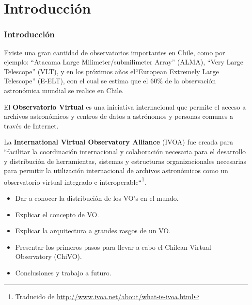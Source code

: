 \section{Introducción}
\begin{frame}
\frametitle{Introducción}
Existe una gran cantidad de observatorios importantes en Chile, como por
ejemplo: ``Atacama Large Milimeter/submilimeter Array'' (ALMA), ``Very Large
Telescope'' (VLT), y en los próximos años el``European Extremely Large
Telescope'' (E-ELT), con el cual se estima que el 60\% de la observación
astronómica mundial se realice en Chile.  
\newline

El \textbf{Observatorio Virtual} es una iniciativa internacional que permite el
acceso a archivos astronómicos y centros de datos a astrónomos y personas
comunes a través de Internet. 

\end{frame}

\begin{frame}
La \textbf{International Virtual Observatory Alliance} (IVOA) fue creada para
``facilitar la coordinación internacional y colaboración necesaria para el
desarrollo y distribución de herramientas, sistemas y estructuras
organizacionales necesarias para permitir la utilización internacional de
archivos astronómicos como un observatorio virtual integrado e
interoperable``\footnote{Traducido de
\url{http://www.ivoa.net/about/what-is-ivoa.html}}.

\begin{itemize}
    \item Dar a conocer la distribución de los VO's en el mundo.
    \item Explicar el concepto de VO.
    \item Explicar la arquitectura a grandes rasgos de un
        VO.
    \item Presentar los primeros pasos para llevar a cabo el
        Chilean Virtual Observatory (ChiVO).
    \item Conclusiones y trabajo a futuro.
\end{itemize}

\end{frame}
